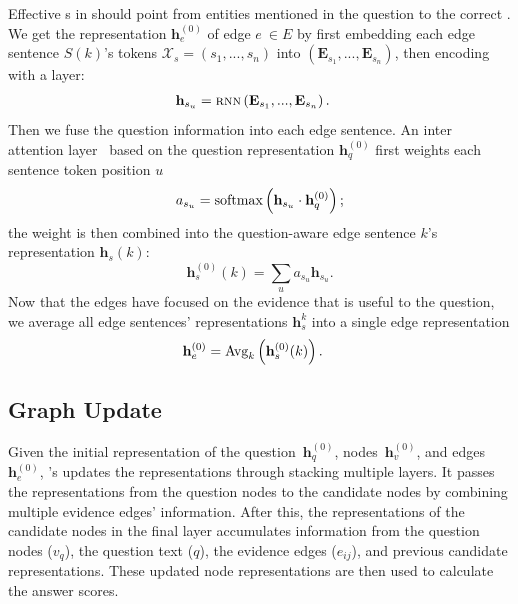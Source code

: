 Effective \tweennode{}s in \name{} should point from entities
mentioned in the question to the correct \rightnode{}.
%
We get the representation $\mathbf{h}_{e}^{(0)}$ of edge $e~\in E$
by first embedding each edge sentence $S(k)$'s tokens $\mathcal{X}_{s} = (s_1, ..., s_n)$
%
into $(\mathbf{E}_{s_1}, ..., \mathbf{E}_{s_n})$, then encoding with a  layer:
\begin{align}
\mathbf{h}_{s_u} &= \rnn{\mathbf{E}_{s_1}, ..., \mathbf{E}_{s_n}}.
\end{align}
Then we fuse the question information into each edge sentence.
An inter attention layer~\cite{seo2016bidirectional} based on the question representation
$\mathbf{h}_q^{(0)}$ first weights each sentence token position $u$
\begin{equation}
  a_{s_u} = \softmax{\mathbf{h}_{s_u} \cdot \mathbf{h}_q^{(0)}};
\end{equation}
the weight is then combined into the question-aware edge sentence $k$'s representation $\mathbf{h}_{s}(k)$:
\begin{equation}
\mathbf{h}_{s}^{(0)}(k) = \sum_u a_{s_u} \mathbf{h}_{s_u}.
\end{equation}
Now that the edges have focused on the evidence that is useful to the question, we
average all edge sentences'
representations $\mathbf{h}_{s}^{k}$ 
into a single edge representation
\begin{align}
    \mathbf{h}_{e}^{(0)} &= \avg{\mathbf{h}_{s}^{(0)}(k)}{k}.
\end{align}

\subsection{Graph Update}
\label{sec:prop}


Given the initial representation of the question~$\mathbf{h}_q^{(0)}$,
nodes~$\mathbf{h}_{v}^{(0)}$, and edges~$\mathbf{h}_{e}^{(0)}$,
\name{}'s  updates the representations through stacking
multiple layers.  It passes the representations from the question
nodes to the candidate nodes by combining multiple evidence edges'
information.
%
After this, the representations of the candidate nodes
in the final layer accumulates information from the question nodes
($v_q$), the question text ($q$), the evidence edges ($e_{ij}$), and
previous candidate representations.
%
These updated node representations are then used to calculate the answer scores.

